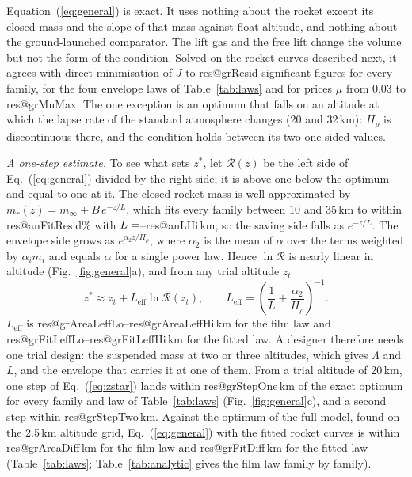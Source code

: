 \documentclass[11pt,a4paper]{article}
\makeatletter
\newcommand{\R}[1]{\csname res@#1\endcsname}
\makeatother
\begin{document}
Equation~(\ref{eq:general}) is exact. It uses nothing about the rocket except its closed mass and the slope of that mass against float altitude, and nothing about the ground-launched comparator. The lift gas and the free lift change the volume but not the form of the condition. Solved on the rocket curves described next, it agrees with direct minimisation of $J$ to \R{grResid} significant figures for every family, for the four envelope laws of Table~\ref{tab:laws} and for prices $\mu$ from 0.03 to \R{grMuMax}. The one exception is an optimum that falls on an altitude at which the lapse rate of the standard atmosphere changes (20 and 32\,km): $H_\rho$ is discontinuous there, and the condition holds between its two one-sided values.

\emph{A one-step estimate.} To see what sets $z^{*}$, let $\mathcal{R}(z)$ be the left side of Eq.~(\ref{eq:general}) divided by the right side; it is above one below the optimum and equal to one at it. The closed rocket mass is well approximated by $m_r(z)=m_\infty+B\,e^{-z/L}$, which fits every family between 10 and 35\,km to within \R{anFitResid}\% with $L=\R{anLLo}$--\R{anLHi}\,km, so the saving side falls as $e^{-z/L}$. The envelope side grows as $e^{\alpha_2z/H_\rho}$, where $\alpha_2$ is the mean of $\alpha$ over the terms weighted by $\alpha_im_i$ and equals $\alpha$ for a single power law. Hence $\ln\mathcal{R}$ is nearly linear in altitude (Fig.~\ref{fig:general}a), and from any trial altitude $z_t$
\begin{equation}
z^{*}\approx z_t+L_{\mathrm{eff}}\ln\mathcal{R}(z_t),\qquad L_{\mathrm{eff}}=\left(\frac{1}{L}+\frac{\alpha_2}{H_\rho}\right)^{-1}.
\label{eq:zstar}
\end{equation}
$L_{\mathrm{eff}}$ is \R{grAreaLeffLo}--\R{grAreaLeffHi}\,km for the film law and \R{grFitLeffLo}--\R{grFitLeffHi}\,km for the fitted law. A designer therefore needs one trial design: the suspended mass at two or three altitudes, which gives $\Lambda$ and $L$, and the envelope that carries it at one of them. From a trial altitude of 20\,km, one step of Eq.~(\ref{eq:zstar}) lands within \R{grStepOne}\,km of the exact optimum for every family and law of Table~\ref{tab:laws} (Fig.~\ref{fig:general}c), and a second step within \R{grStepTwo}\,km. Against the optimum of the full model, found on the 2.5\,km altitude grid, Eq.~(\ref{eq:general}) with the fitted rocket curves is within \R{grAreaDiff}\,km for the film law and \R{grFitDiff}\,km for the fitted law (Table~\ref{tab:laws}; Table~\ref{tab:analytic} gives the film law family by family).
\end{document}
